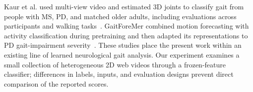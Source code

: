 Kaur et al. used multi-view video and estimated 3D joints to classify gait from people with MS, PD, and matched older adults, including evaluations across participants and walking tasks~\cite{kaur2023}. GaitForeMer combined motion forecasting with activity classification during pretraining and then adapted its representations to PD gait-impairment severity~\cite{gaitforemer}. These studies place the present work within an existing line of learned neurological gait analysis. Our experiment examines a small collection of heterogeneous 2D web videos through a frozen-feature classifier; differences in labels, inputs, and evaluation designs prevent direct comparison of the reported scores.
